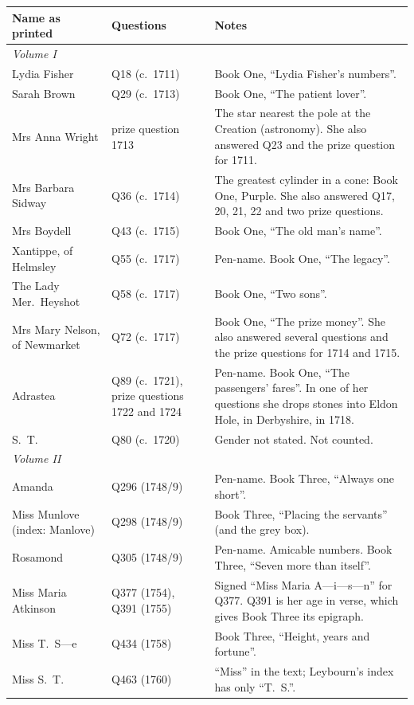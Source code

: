 \documentclass[11pt,a4paper]{article}
\begin{document}
\begin{longtable}{p{4.2cm} p{2.8cm} p{8.2cm}}
\toprule
Name as printed & Questions & Notes\\
\midrule
\endhead
\multicolumn{3}{l}{\textit{Volume I}}\\
Lydia Fisher & Q18 (c.\ 1711) & Book One, ``Lydia Fisher's numbers''.\\
Sarah Brown & Q29 (c.\ 1713) & Book One, ``The patient lover''.\\
Mrs Anna Wright & prize question 1713 & The star nearest the pole at the Creation (astronomy).
  She also answered Q23 and the prize question for 1711.\\
Mrs Barbara Sidway & Q36 (c.\ 1714) & The greatest cylinder in a cone: Book One, Purple.
  She also answered Q17, 20, 21, 22 and two prize questions.\\
Mrs Boydell & Q43 (c.\ 1715) & Book One, ``The old man's name''.\\
Xantippe, of Helmsley & Q55 (c.\ 1717) & Pen-name. Book One, ``The legacy''.\\
The Lady Mer.\ Heyshot & Q58 (c.\ 1717) & Book One, ``Two sons''.\\
Mrs Mary Nelson, of Newmarket & Q72 (c.\ 1717) & Book One, ``The prize money''. She also
  answered several questions and the prize questions for 1714 and 1715.\\
Adrastea & Q89 (c.\ 1721), prize questions 1722 and 1724 & Pen-name. Book One, ``The
  passengers' fares''. In one of her questions she drops stones into Eldon Hole, in Derbyshire, in 1718.\\
S.~T. & Q80 (c.\ 1720) & Gender not stated. Not counted.\\[4pt]
\multicolumn{3}{l}{\textit{Volume II}}\\
Amanda & Q296 (1748/9) & Pen-name. Book Three, ``Always one short''.\\
Miss Munlove (index: Manlove) & Q298 (1748/9) & Book Three, ``Placing the servants'' (and
  the grey box).\\
Rosamond & Q305 (1748/9) & Pen-name. Amicable numbers. Book Three, ``Seven more than
  itself''.\\
Miss Maria Atkinson & Q377 (1754), Q391 (1755) & Signed ``Miss Maria A---i---s---n'' for
  Q377. Q391 is her age in verse, which gives Book Three its epigraph.\\
Miss T.~S---e & Q434 (1758) & Book Three, ``Height, years and fortune''.\\
Miss S.~T. & Q463 (1760) & ``Miss'' in the text; Leybourn's index has only ``T.~S.''.

\end{longtable}
\end{document}
